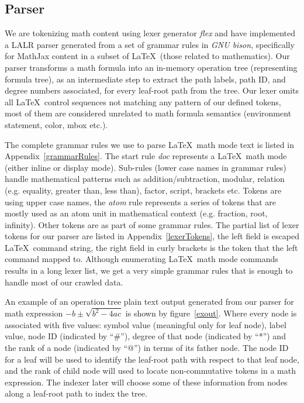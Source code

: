\subsection{Parser}
We are tokenizing math content using lexer generator \textit{flex} and have implemented a LALR parser generated from a set of grammar rules in \textit{GNU bison}, specifically for MathJax content in a subset of \LaTeX\ (those related to mathematics).
Our parser transforms a math formula into an in-memory operation tree (representing formula tree), as an intermediate step to extract the path labels, path ID, and degree numbers associated, for every leaf-root path from the tree. 
Our lexer omits all \LaTeX\ control sequences not matching any pattern of our defined tokens, most of them are considered unrelated to math formula semantics (environment statement, color, mbox etc.).

The complete grammar rules we use to parse \LaTeX\ math mode text is listed in Appendix~\ref{grammarRules}. 
The start rule \textit{doc} represents a \LaTeX\ math mode (either inline or display mode).
Sub-rules (lower case names in grammar rules) handle mathematical patterns such as addition/subtraction, modular, relation (e.g. equality, greater than, less than), factor, script, brackets etc. 
Tokens are using upper case names, the \textit{atom} rule represents a series of tokens that are mostly used as an atom unit in mathematical context (e.g. fraction, root, infinity). Other tokens are as part of some grammar rules.
The partial list of lexer tokens for our parser are listed in Appendix~\ref{lexerTokens}, the left field is escaped \LaTeX\ command string, the right field in curly brackets is the token that the left command mapped to.
Although enumerating \LaTeX\ math mode commands results in a long lexer list, we get a very simple grammar rules that is enough to handle most of our crawled data.

An example of an operation tree plain text output generated from our parser for math expression 
$ -b \pm \sqrt{b^2 - 4ac}$ is shown by figure~\ref{exout}.
Where every node is associated with five values: symbol value (meaningful only for leaf node), label value, node ID (indicated by ``\#''), degree of that node (indicated by ``*'') and the rank of a node (indicated by ``@'') in terms of its father node.
The node ID for a leaf will be used to identify the leaf-root path with respect to that leaf node, and the rank of child node will used to locate non-commutative tokens in a math expression.
The indexer later will choose some of these information from nodes along a leaf-root path to index the tree.

